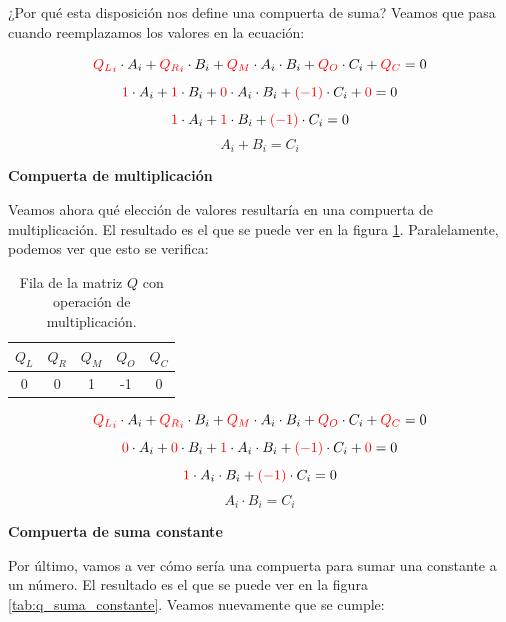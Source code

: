 ¿Por qué esta disposición nos define una compuerta de suma? Veamos que pasa cuando reemplazamos los valores en la ecuación:
\begin{samepage}
$$\textcolor{red}{{Q_L}_i} \cdot A_i + \textcolor{red}{{Q_R}_i} \cdot B_i + \textcolor{red}{Q_M}\cdot A_i\cdot B_i + \textcolor{red}{Q_O}\cdot C_i + \textcolor{red}{Q_C} = 0$$
$$\textcolor{red}{1} \cdot A_i + \textcolor{red}{1} \cdot B_i + \textcolor{red}{0}\cdot A_i\cdot B_i + \textcolor{red}{(-1)} \cdot C_i + \textcolor{red}{0} = 0$$
$$\textcolor{red}{1} \cdot A_i + \textcolor{red}{1} \cdot B_i + \textcolor{red}{(-1)} \cdot C_i = 0$$
$$A_i + B_i = C_i$$
\end{samepage}

\textbf{Compuerta de multiplicación}

Veamos ahora qué elección de valores resultaría en una compuerta de multiplicación. El resultado es el que se puede ver en la figura \ref{tab:q_multiplicacion}. Paralelamente, podemos ver que esto se verifica:

\begin{table}[h!]
\begin{center}
\begin{tabular}{ccccc}
\toprule
\textbf{$Q_L$} & \textbf{$Q_R$} & \textbf{$Q_M$} & \textbf{$Q_O$} & \textbf{$Q_C$} \\
\midrule
0 & 0 & 1 & -1 & 0 \\
\bottomrule
\end{tabular}
\caption{Fila de la matriz $Q$ con operación de multiplicación.}
\label{tab:q_multiplicacion}
\end{center}
\end{table}

\begin{samepage}
$$\textcolor{red}{{Q_L}_i} \cdot A_i + \textcolor{red}{{Q_R}_i} \cdot B_i + \textcolor{red}{Q_M}\cdot A_i\cdot B_i + \textcolor{red}{Q_O}\cdot C_i + \textcolor{red}{Q_C} = 0$$
$$\textcolor{red}{0} \cdot A_i + \textcolor{red}{0} \cdot B_i + \textcolor{red}{1}\cdot A_i\cdot B_i + \textcolor{red}{(-1)} \cdot C_i + \textcolor{red}{0} = 0$$
$$\textcolor{red}{1}\cdot A_i\cdot B_i + \textcolor{red}{(-1)} \cdot C_i = 0$$
$$A_i \cdot B_i = C_i$$
\end{samepage}

\textbf{Compuerta de suma constante}

Por último, vamos a ver cómo sería una compuerta para sumar una constante a un número. El resultado es el que se puede ver en la figura \ref{tab:q_suma_constante}. Veamos nuevamente que se cumple:

